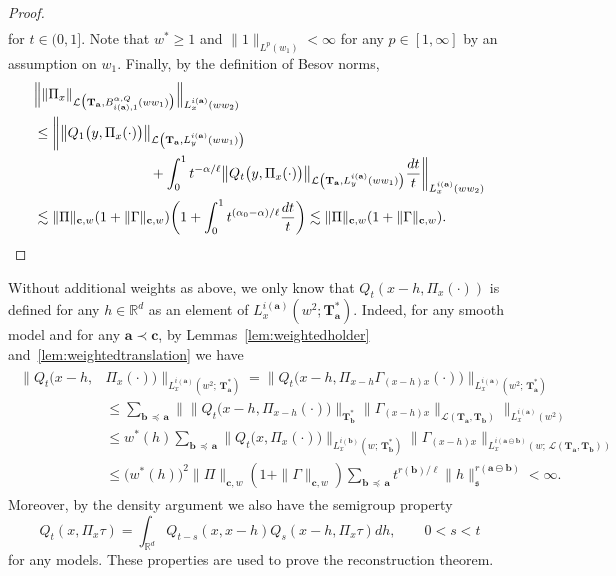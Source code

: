 \documentclass[AHL,Unicode,longabstracts,published]{cedram}
\newcommand{\bbR}{\mathbb{R}}
\newcommand{\mfs}{\mathfrak{s}}
\newcommand{\wco}{w^*}
\newcommand{\bfa}{\mathbf{a}}
\newcommand{\bfb}{\mathbf{b}}
\newcommand{\bfc}{\mathbf{c}}
\newcommand{\bfaob}{\mathbf{a}\ominus\mathbf{b}}
\newcommand{\bfT}{\mathbf{T}}
\newcommand{\mcL}{\mathcal{L}}
\begin{document}
\begin{proof}
\begin{multline*}
\end{multline*}
\endgroup
for $t\in(0,1]$. Note that $w^*\ge1$ and $\|1\|_{L^p(w_1)}<\infty$ for any $p\in[1,\infty]$ by an assumption on $w_1$. Finally, by the definition of Besov norms,
\begin{align*}
&\Big\|\|\Pi_x\|_{\mcL\big(\bfT_\bfa,B_{i(\bfa),1}^{\alpha,Q}(ww_1)\big)}\Big\|_{L_x^{i(\bfa)}(ww_2)}\\
&\le\bigg\|
\big\|Q_1\big(y,\Pi_x(\cdot)\big)\big\|_{\mcL\left(\bfT_\bfa,L_y^{i(\bfa)}(ww_1)\right)}\\
&\mkern150mu+\int_0^1t^{-\alpha/\ell}\big\|Q_t\big(y,\Pi_x(\cdot)\big)\big\|_{\mcL\left(\bfT_\bfa,L_y^{i(\bfa)}(ww_1)\right)}\frac{dt}t
\bigg\|_{L_x^{i(\bfa)}(ww_2)}\\
&\lesssim\|\Pi\|_{\bfc,w}(1+\|\Gamma\|_{\bfc,w})\bigg(1+\int_0^1t^{(\alpha_0-\alpha)/\ell}\frac{dt}t\bigg)
\lesssim\|\Pi\|_{\bfc,w}(1+\|\Gamma\|_{\bfc,w}).\qedhere
\end{align*}
\end{proof}

\begin{rema}\label{rem:whatisknownforZ}
Without additional weights as above, we only know that $Q_t(x-h,\Pi_x(\cdot))$ is defined for any $h\in\bbR^d$ as an element of $L_x^{i(\bfa)}(w^2;\bfT_\bfa^*)$. Indeed, for any smooth model and for any $\bfa\prec\bfc$, by Lemmas~\ref{lem:weightedholder} and~\ref{lem:weightedtranslation} we have
\begin{align}\label{eq:Q(x-h,Pix)}
\begin{aligned}
\big\|Q_t\big(x-h,&\Pi_x(\cdot)\big)\big\|_{L_x^{i(\bfa)}\left(w^2;\,\bfT_\bfa^*\right)} =\big\|Q_t\big(x-h,\Pi_{x-h}\Gamma_{(x-h)x}(\cdot)\big)\big\|_{L_x^{i(\bfa)}\left(w^2;\,\bfT_\bfa^*\right)}\\
&\le\sum_{\bfb\,\preceq\,\bfa}\Big\|\big\|Q_t\big(x-h,\Pi_{x-h}(\cdot)\big)\big\|_{\bfT_\bfb^*}\|\Gamma_{(x-h)x}\|_{\mcL(\bfT_\bfa,\bfT_\bfb)}\Big\|_{L_x^{i(\bfa)}(w^2)}\\
&\le \wco(h)\sum_{\bfb\,\preceq\,\bfa}\big\|Q_t\big(x,\Pi_x(\cdot)\big)\big\|_{L_x^{i(\bfb)}\left(w;\,\bfT_\bfb^*\right)}\|\Gamma_{(x-h)x}\|_{L_x^{i(\bfaob)}(w;\,\mcL(\bfT_\bfa,\bfT_\bfb))}\\
&\le \big(\wco(h)\big)^2\|\Pi\|_{\bfc,w}(1+\|\Gamma\|_{\bfc,w})\sum_{\bfb\,\preceq\,\bfa}t^{r(\bfb)/\ell}\|h\|_\mfs^{r(\bfaob)}<\infty.
\end{aligned}
\end{align}
Moreover, by the density argument we also have the semigroup property
\[
Q_t(x,\Pi_x\tau)=\int_{\bbR^d}Q_{t-s}(x,x-h)Q_s(x-h,\Pi_x\tau)dh,\qquad 0<s<t
\]
for any models. These properties are used to prove the reconstruction theorem.
\end{rema}
\end{document}
